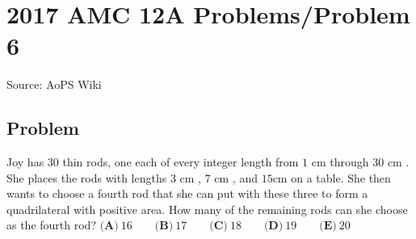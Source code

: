 \documentclass[12pt]{article}
\begin{document}
\section*{{2017 AMC 12A Problems/Problem 6}}
Source: AoPS Wiki

\subsection*{Problem}
Joy has $30$ thin rods, one each of every integer length from $1 \text{ cm}$ through $30 \text{ cm}$ . She places the rods with lengths $3 \text{ cm}$ , $7 \text{ cm}$ , and $15 \text{cm}$ on a table. She then wants to choose a fourth rod that she can put with these three to form a quadrilateral with positive area. How many of the remaining rods can she choose as the fourth rod? $\textbf{(A)}\ 16 \qquad\textbf{(B)}\ 17 \qquad\textbf{(C)}\ 18 \qquad\textbf{(D)}\ 19 \qquad\textbf{(E)}\ 20$
\end{document}
